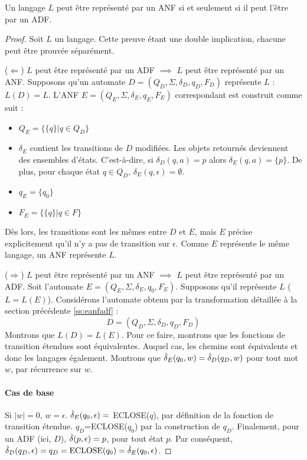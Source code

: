 \begin{theorem}
	Un langage $L$ peut être représenté par un ANF si et seulement si il peut l'être par un ADF.
\end{theorem}

\begin{proof}
	 Soit $L$ un langage. Cette preuve étant une double implication, chacune peut être prouvée séparément.
	
	($\Leftarrow$) $L$ peut être représenté par un ADF $\implies$ $L$ peut être représenté par un ANF. Supposons qu'un automate $D=(Q_D, \Sigma, \delta_D, q_D, F_D)$ représente $L$ : $L(D)=L$. 
	L'ANF $E=(Q_E, \Sigma, \delta_E, q_E, F_E)$ correspondant est construit comme suit :
	
	\begin{itemize}
		\item $Q_E=\{\{q\}|q\in Q_D\}$
		\item $\delta_E$ contient les transitions de $D$ modifiées. Les objets retournés deviennent des ensembles d'états. C'est-à-dire, si $\delta_D(q,a)=p$ alors $\delta_E(q,a)=\{p\}$. De plus, pour chaque état $q\in Q_D$, $\delta_E(q,\epsilon)=\emptyset$. 
		\item $q_E=\{q_0\}$
		\item $F_E=\{\{q\}| q\in F\}$
	\end{itemize}
	 
	 Dès lors, les transitions sont les mêmes entre $D$ et $E$, mais $E$ précise explicitement qu'il n'y a pas de transition sur $\epsilon$. Comme $E$ représente le même langage, un ANF représente $L$.
	
	
	($\Rightarrow$) $L$ peut être représenté par un ANF $\implies$ $L$ peut être représenté par un ADF. Soit l'automate $E=(Q_E, \Sigma, \delta_E, q_0, F_E)$. Supposons qu'il représente $L$ ($L=L(E)$). Considérons l'automate obtenu par la transformation détaillée à la section précédente \ref{ss:eanfadf} :
	$$
	D=(Q_D, \Sigma, \delta_D, q_D, F_D)
	$$
	Montrons que $L(D)=L(E)$. Pour ce faire, montrons que les fonctions de transition étendues sont équivalentes. Auquel cas, les chemins sont équivalents et donc les langages également.
	Montrons que $\hat{\delta}_E(q_0,w)=\hat{\delta}_D(q_D,w)$ pour tout mot $w$, par récurrence sur $w$.
	
	\paragraph{Cas de base} Si $|w|=0$, $w=\epsilon$. $\hat{\delta}_E(q_0,\epsilon)=$ ECLOSE($q$), par définition de la fonction de transition étendue. $q_D$=ECLOSE($q_0$) par la construction de $q_D$. Finalement, pour un ADF (ici, $D$), $\hat{\delta}(p,\epsilon)=p$, pour tout état $p$. Par conséquent, $\hat{\delta}_D(q_D,\epsilon)=q_D=\text{ECLOSE(}q_0\text{)}=\hat{\delta}_E(q_0,\epsilon)$.
	

\end{proof}
